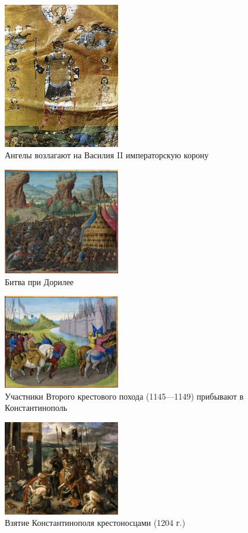 \begin{figure}[ht]
    \centering
    \includegraphics[width=0.45\textwidth]{img/vizant/7.jpg}
    \caption{Ангелы возлагают на Василия II императорскую корону}
    \label{fig:angels}
\end{figure}

\begin{figure}[ht]
    \centering
    \includegraphics[width=0.45\textwidth]{img/vizant/Passages_faiz_oultre_mer_SEBASTIEN_MAMEROT_140_(cropped).png}
    \caption{Битва при Дорилее}
    \label{fig:dorilee}
\end{figure}


\begin{figure}[ht]
    \centering
    \includegraphics[width=0.45\textwidth]{img/vizant/8.jpg}
    \caption{Участники Второго крестового похода (1145—1149) прибывают в Константинополь}
    \label{fig:crusaders_2}
\end{figure}

\begin{figure}[ht]
    \centering
    \includegraphics[width=0.45\textwidth]{img/vizant/9.jpg}
    \caption{Взятие Константинополя крестоносцами (1204 г.)}
    \label{fig:crusaders_3}
\end{figure}
